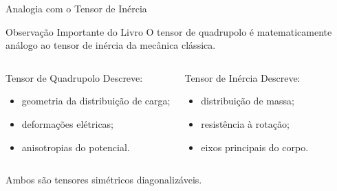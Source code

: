 \documentclass[aspectratio=169]{beamer}
\begin{document}
\begin{frame}{Analogia com o Tensor de Inércia}

\begin{mybox}{Observação Importante do Livro}
O tensor de quadrupolo é matematicamente análogo ao tensor de inércia da mecânica clássica.
\end{mybox}

\begin{columns}


\begin{alertblock}{Tensor de Quadrupolo}
Descreve:
\begin{itemize}
\item geometria da distribuição de carga;
\item deformações elétricas;
\item anisotropias do potencial.
\end{itemize}
\end{alertblock}


\begin{alertblock}{Tensor de Inércia}
Descreve:
\begin{itemize}
\item distribuição de massa;
\item resistência à rotação;
\item eixos principais do corpo.
\end{itemize}
\end{alertblock}

\end{columns}

\vspace{0.4cm}

\begin{center}

\Large
Ambos são tensores simétricos diagonalizáveis.

\end{center}

\end{frame}
\end{document}
